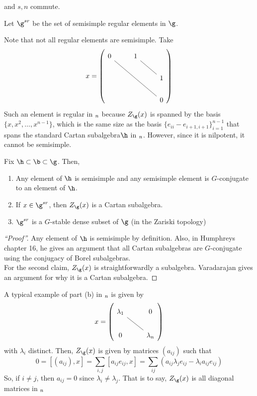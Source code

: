  and \(s,n\) commute.
 \begin{defn}
   Let \(\g^{sr}\) be the set of semisimple regular elements in
   \(\g\). 
 \end{defn}
 \begin{example}
   Note that not all regular elements are semisimple. Take \[
     x = \left(
       \begin{tikzcd}
         0 \ar[rrdd, dash]& 1 \ar[rd, dash] & \\
         & & 1 \\
         & & 0
       \end{tikzcd}
     \right)
   \]
   Such an element is regular in \(\sl_n\) because \(Z_\g(x)\) is
   spanned by the basis \(\{x, x^2, \ldots, x^{n-1}\}\), which is the
   same size as the basis \(\{e_{ii} - e_{i+1,i+1}\}_{i=1}^{n-1}\)
   that spans the standard Cartan subalgebra\(\h\) in
   \(\sl_n\). However, since it is nilpotent, it cannot be semisimple.
 \end{example}
 \begin{prop}
   Fix \(\h \subset \b \subset \g\). Then,
   \begin{enumerate}
   \item Any element of \(\h\) is semisimple and any semisimple
     element is \(G\)-conjugate to an element of \(\h\).
   \item If \(x \in \g^{sr}\), then \(Z_\g(x)\) is a Cartan
     subalgebra.
   \item \(\g^{sr}\) is a \(G\)-stable dense subset of \(\g\) (in the
     Zariski topology)
   \end{enumerate}
 \end{prop}
 \begin{proof}[``Proof'']
   Any element of \(\h\) is semisimple by definition. Also, in
   Humphreys chapter 16, he gives an argument that all Cartan subalgebras
   are \(G\)-conjugate using the conjugacy of Borel subalgebras. \\

   For the second claim, \(Z_\g(x)\) is straightforwardly a
   subalgebra. Varadarajan gives an argument for why it is a Cartan
   subalgebra. 
 \end{proof}
 \begin{example}
   A typical example of part (b) in \(\sl_n\) is given by \[
     x = \left(
       \begin{tikzcd}
         \lambda_1 \ar[rd, dash]& 0 \\
         0 & \lambda_n
       \end{tikzcd}
     \right)
   \]
   with \(\lambda_i\) distinct. Then, \(Z_\g(x)\) is given by matrices
   \((a_{ij})\) such that \[
     0 = [(a_{ij}), x] = \sum_{i,j} [a_{ij} e_{ij}, x] = \sum_{ij}
     (a_{ij} \lambda_j e_{ij} - \lambda_i a_{ij} e_{ij})
   \]
   So, if \(i \neq j\), then \(a_{ij} = 0\) since \(\lambda_i \neq
   \lambda_j\). That is to say, \(Z_\g(x)\) is all diagonal matrices
   in \(\sl_n\)
 \end{example}
